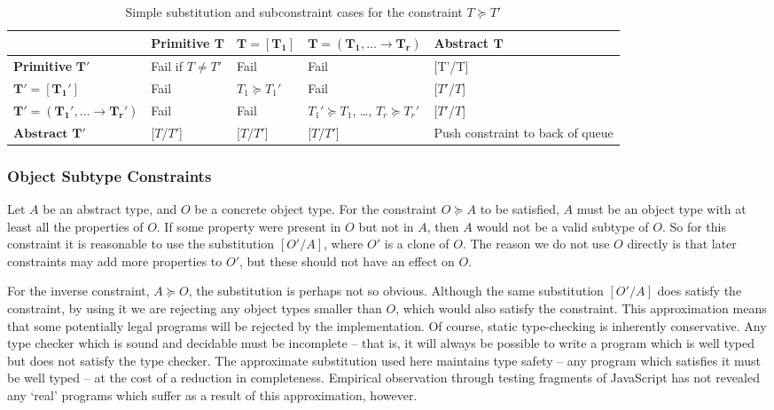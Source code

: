 \documentclass[12pt,a4paper,twoside,openright]{report}
\theoremstyle{definition}
\theoremstyle{dotless}
\begin{document}
\begin{table}[H]
  \renewcommand{\arraystretch}{1.5}
  \begin{center}
    \begin{tabular}{  m{3.5cm}  m{2.5cm}  m{1.6cm}  m{3.4cm}  m{3cm} }
	  \toprule
	  & \textbf{Primitive $\mathbf{T}$}  &
   	  $\mathbf{T=[T_1]}$ &
 	  $\mathbf{T=(T_1, \dots \rightarrow T_r)}$ &
 	  \textbf{Abstract $\mathbf{T}$} \\
 	  \midrule
	  \textbf{Primitive }$\mathbf{T'}$ &
   	  Fail if $T\neq T'$ &
 	  Fail &
 	  Fail &
 	  [T'/T]
	  \\
	  $\mathbf{T'=[T_1']}$          &
   	  Fail &
   	  $T_1\succeq T_1'$ &
   	  Fail &
 	  [$T'$/$T$]
	  \\
	  $\mathbf{T'=(T_1', \dots \rightarrow T_r')}$ &
   	  Fail &
 	  Fail &
 	  \parbox[t]{3cm}{$T_1'\succeq T_1$,\\ \dots,\\ $T_r\succeq T_r'$} &
 	  [$T'$/$T$]
	  \\
	  $\textbf{Abstract }\mathbf{T'}$&
 	  [$T$/$T'$]&
 	  [$T$/$T'$]&
 	  [$T$/$T'$]&
   	  Push constraint to back of queue \\
	  \bottomrule
    \end{tabular}
  \end{center}
  \caption{Simple substitution and subconstraint cases for the constraint $T\succeq T'$}
  \label{tab:crc}
\end{table}

\subsubsection*{Object Subtype Constraints} 
Let $A$ be an abstract type, and $O$ be a concrete object type. For the
constraint $O \succeq A$ to be satisfied, $A$ must be an object type with at
least all the properties of $O$. If some property were present in $O$ but not in
$A$, then $A$ would not be a valid subtype of $O$. So for this constraint it is
reasonable to use the substitution $[O'/A]$, where $O'$ is a clone of $O$. The
reason we do not use $O$ directly is that later constraints may add more properties
to $O'$, but these should not have an effect on $O$.

For the inverse constraint, $A\succeq O$, the substitution is perhaps not so
obvious. Although the same substitution $[O'/A]$ does satisfy the constraint,
by using it we are rejecting any object types smaller than $O$, which would
also satisfy the constraint. This approximation means that some potentially
legal programs will be rejected by the implementation. Of course, static
type-checking is inherently conservative.  Any type checker which is sound and
decidable must be incomplete -- that is, it will always be possible to write a
program which is well typed but does not satisfy the type checker. The
approximate substitution used here maintains type safety -- any program which
satisfies it must be well typed -- at the cost of a reduction in
completeness. Empirical observation through testing fragments of JavaScript has
not revealed any `real' programs which suffer as a result of this
approximation, however.
\end{document}
